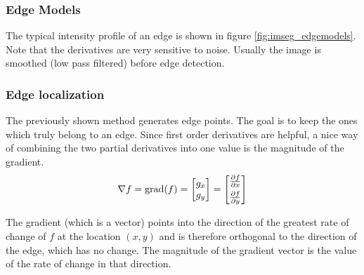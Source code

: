\subsubsection{Edge Models}
The typical intensity profile of an edge is shown in figure \ref{fig:imseg_edgemodels}.
Note that the derivatives are very sensitive to noise. Usually the image is smoothed (low pass filtered) before
edge detection.

\newpage
\subsubsection{Edge localization}
\begin{multicols}{2}
The previously shown method generates edge points. The goal is to keep the ones which truly belong to an edge.
Since first order derivatives are helpful, a nice way of combining the two partial derivatives into one value is the magnitude of the gradient.
\columnbreak
\begin{equation}
\nabla f = \text{grad}(f) = 
\begin{bmatrix} g_x \\ g_y \end{bmatrix} 
= \begin{bmatrix} \frac{\partial f}{\partial x} \\[4pt] \frac{\partial f}{\partial y} \end{bmatrix}\notag
\end{equation}
\end{multicols}
The gradient (which is a vector) points into the direction of the greatest rate of change of $f$ at the location $(x,y)$ and is therefore orthogonal to the direction of the edge, which has no change.
The magnitude of the gradient vector is the value of the rate of change in that direction.
